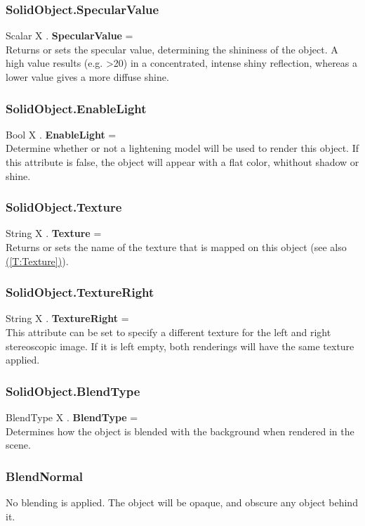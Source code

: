 \documentclass[10pt]{book}
\newcommand{\linkitem}[1]{\hyperref[#1]{\nameref{#1} (\ref{#1})}}
\begin{document}
\subsubsection{SolidObject.SpecularValue \label{F:SolidObject:SpecularValue}}
Scalar X . \textbf{SpecularValue} = \\
Returns or sets the specular value, determining the shininess of the object. A high value results (e.g. >20) in a concentrated, intense shiny reflection, whereas a lower value gives a more diffuse shine.

\subsubsection{SolidObject.EnableLight \label{F:SolidObject:EnableLight}}
Bool X . \textbf{EnableLight} = \\
Determine whether or not a lightening model will be used to render this object. If this attribute is false, the object will appear with a flat color, whithout shadow or shine.

\subsubsection{SolidObject.Texture \label{F:SolidObject:Texture}}
String X . \textbf{Texture} = \\
Returns or sets the name of the texture that is mapped on this object (see also \linkitem{T:Texture}).

\subsubsection{SolidObject.TextureRight \label{F:SolidObject:TextureRight}}
String X . \textbf{TextureRight} = \\
This attribute can be set to specify a different texture for the left and right stereoscopic image. If it is left empty, both renderings will have the same texture applied.

\subsubsection{SolidObject.BlendType \label{F:SolidObject:BlendType}}
BlendType X . \textbf{BlendType} = \\
Determines how the object is blended with the background when rendered in the scene.

\subsubsection{BlendNormal \label{T:BlendType|BlendNormal}}
No blending is applied. The object will be opaque, and obscure any object behind it.
\end{document}
